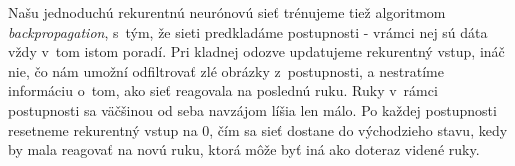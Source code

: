 Našu jednoduchú rekurentnú neurónovú sieť trénujeme tiež algoritmom \textit{backpropagation}, s~tým, že sieti predkladáme postupnosti - vrámci nej sú dáta vždy v~tom istom poradí. Pri kladnej odozve updatujeme rekurentný vstup, ináč nie, čo nám umožní odfiltrovať zlé obrázky z~postupnosti, a nestratíme informáciu o~tom, ako sieť reagovala na poslednú ruku. Ruky v~rámci postupnosti sa väčšinou od seba navzájom líšia len málo. Po každej postupnosti resetneme rekurentný vstup na 0, čím sa sieť dostane do východzieho stavu, kedy by mala reagovať na novú ruku, ktorá môže byť iná ako doteraz videné ruky.